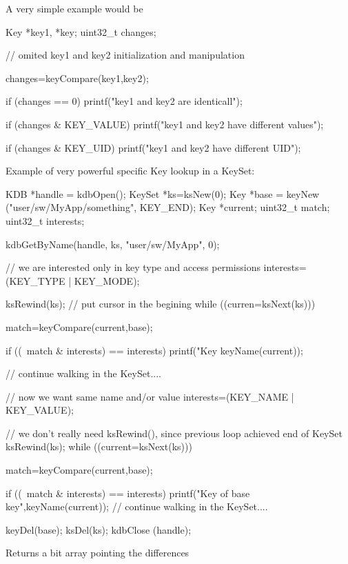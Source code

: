 \begin{DoxyParagraph}{A very simple example would be}

\begin{DoxyCode}
Key *key1, *key;
uint32_t changes;

// omited key1 and key2 initialization and manipulation

changes=keyCompare(key1,key2);

if (changes == 0) printf("key1 and key2 are identicall\n");

if (changes & KEY_VALUE)
        printf("key1 and key2 have different values\n");
 
if (changes & KEY_UID)
        printf("key1 and key2 have different UID\n");
\end{DoxyCode}

\end{DoxyParagraph}
\begin{DoxyParagraph}{Example of very powerful specific Key lookup in a KeySet:}

\begin{DoxyCode}
KDB *handle = kdbOpen();
KeySet *ks=ksNew(0);
Key *base = keyNew ("user/sw/MyApp/something", KEY_END);
Key *current;
uint32_t match;
uint32_t interests;


kdbGetByName(handle, ks, "user/sw/MyApp", 0);

// we are interested only in key type and access permissions
interests=(KEY_TYPE | KEY_MODE);

ksRewind(ks);   // put cursor in the begining
while ((curren=ksNext(ks))) {
        match=keyCompare(current,base);
        
        if ((~match & interests) == interests)
                printf("Key %
      keyName(current));

        // continue walking in the KeySet....
}

// now we want same name and/or value
interests=(KEY_NAME | KEY_VALUE);

// we don't really need ksRewind(), since previous loop achieved end of KeySet
ksRewind(ks);
while ((current=ksNext(ks))) {
        match=keyCompare(current,base);

        if ((~match & interests) == interests) {
                printf("Key %
                        of base key",keyName(current));
        }
        // continue walking in the KeySet....
}

keyDel(base);
ksDel(ks);
kdbClose (handle);
\end{DoxyCode}

\end{DoxyParagraph}
\begin{DoxyReturn}{Returns}
a bit array pointing the differences 
\end{DoxyReturn}

